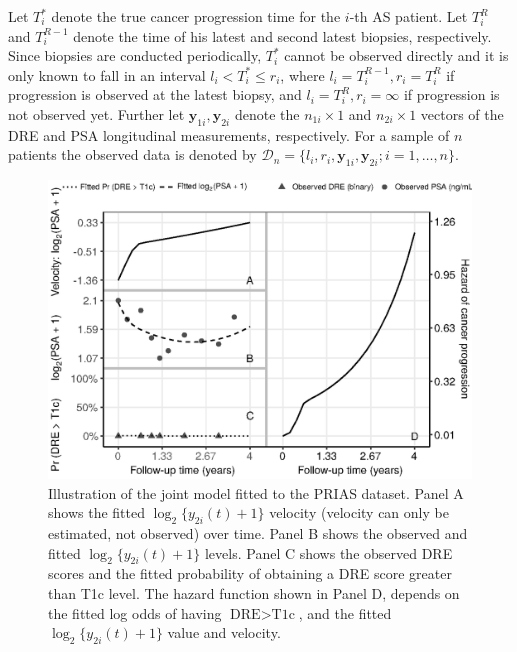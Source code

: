Let $T_i^*$ denote the true cancer progression time for the $i$-th AS patient. Let $T_i^R$ and $T_i^{R-1}$ denote the time of his latest and second latest biopsies, respectively. Since biopsies are conducted periodically, $T_i^*$ cannot be observed directly and it is only known to fall in an interval $l_i < T_i^* \leq r_i$, where $l_i = T_i^{R-1}, r_i = T_i^R$ if progression is observed at the latest biopsy, and $l_i = T_i^R, r_i=\infty$ if progression is not observed yet. Further let $\boldsymbol{y}_{1i}, \boldsymbol{y}_{2i}$ denote the $n_{1i} \times 1$ and $n_{2i} \times 1$ vectors of the DRE and PSA longitudinal measurements, respectively. For a sample of $n$ patients the observed data is denoted by $\mathcal{D}_n = \{l_i, r_i, \boldsymbol{y}_{1i}, \boldsymbol{y}_{2i}; i = 1, \ldots, n\}$.
\begin{figure}[!htb]
\captionsetup{justification=justified}
\centerline{\includegraphics[width=\columnwidth]{images/jmExplanationPlot_1757.eps}}
\caption{Illustration of the joint model fitted to the PRIAS dataset. Panel A shows the fitted $\log_2 \{y_{2i}(t) + 1\}$ velocity (velocity can only be estimated, not observed) over time. Panel B shows the observed and fitted $\log_2 \{y_{2i}(t) + 1\}$ levels. Panel C shows the observed DRE scores and the fitted probability of obtaining a DRE score greater than T1c level. The hazard function shown in Panel D, depends on the fitted log odds of having $\mbox{DRE} > \mbox{T1c}$, and the fitted $\log_2 \{y_{2i}(t) + 1\}$ value and velocity.}
\label{fig:jmExplanationPlot_1757}
\end{figure}

